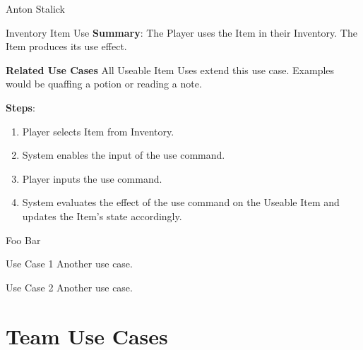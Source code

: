 \documentclass[12pt]{report}
\begin{document}
\begin{section}{Anton Stalick}
\begin{subsection}{Inventory Item Use}
\textbf{Summary}:
The Player uses the Item in their Inventory. The Item produces its
use effect.

\textbf{Related Use Cases}
All Useable Item Uses extend this use case. Examples would be quaffing
a potion or reading a note.

\textbf{Steps}:
\begin{enumerate}
\item Player selects Item from Inventory.
\item System enables the input of the use command.
\item Player inputs the use command.
\item System evaluates the effect of the use command on the
Useable Item and updates the Item's state accordingly.
\end{enumerate}

\end{subsection}
\end{section}

\begin{section}{Foo Bar}
\begin{subsection}{Use Case 1}
Another use case.
\end{subsection}

\begin{subsection}{Use Case 2}
Another use case.
\end{subsection}
\end{section}

\chapter{Team Use Cases}

\end{document}
